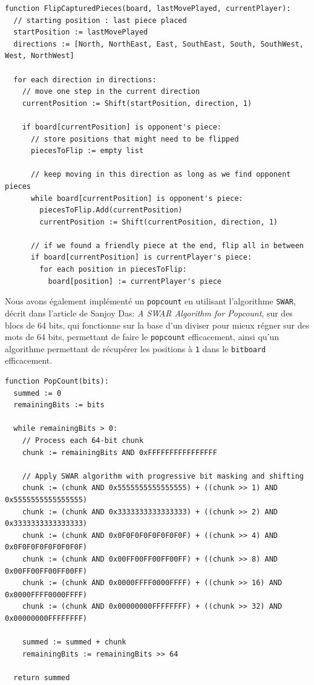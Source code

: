 \documentclass[a4paper,12pt]{article}
\begin{document}
\begin{lstlisting}[caption={Pseudocode pour l'algorithme de capture de pions : FlipCapturedPieces}, label={lst:flip_captured_pieces}]
function FlipCapturedPieces(board, lastMovePlayed, currentPlayer):
  // starting position : last piece placed
  startPosition := lastMovePlayed
  directions := [North, NorthEast, East, SouthEast, South, SouthWest, West, NorthWest]

  for each direction in directions:
    // move one step in the current direction
    currentPosition := Shift(startPosition, direction, 1)

    if board[currentPosition] is opponent's piece:
      // store positions that might need to be flipped
      piecesToFlip := empty list

      // keep moving in this direction as long as we find opponent pieces
      while board[currentPosition] is opponent's piece:
        piecesToFlip.Add(currentPosition)
        currentPosition := Shift(currentPosition, direction, 1)

      // if we found a friendly piece at the end, flip all in between
      if board[currentPosition] is currentPlayer's piece:
        for each position in piecesToFlip:
          board[position] := currentPlayer's piece
\end{lstlisting}

\newpage

Nous avons également implémenté un \texttt{popcount} en utilisant l’algorithme
\texttt{SWAR}, décrit dans l'article de Sanjoy Das: \textit{A SWAR Algorithm
    for Popcount}\cite{SWARPointers}, sur des blocs de 64 bits, qui fonctionne sur
la base d’un diviser pour mieux régner sur des mots de 64 bits, permettant de
faire le \texttt{popcount} efficacement, ainsi qu’un algorithme permettant de
récupérer les positions à \texttt{1} dans le \texttt{bitboard} efficacement.\\

\begin{lstlisting}[caption={Pseudocode pour le popcount (implémentation de l'algorithme SWAR): PopCount}, label={lst:popcount}]
function PopCount(bits):
  summed := 0
  remainingBits := bits

  while remainingBits > 0:
    // Process each 64-bit chunk
    chunk := remainingBits AND 0xFFFFFFFFFFFFFFFF

    // Apply SWAR algorithm with progressive bit masking and shifting
    chunk := (chunk AND 0x5555555555555555) + ((chunk >> 1) AND 0x5555555555555555)
    chunk := (chunk AND 0x3333333333333333) + ((chunk >> 2) AND 0x3333333333333333)
    chunk := (chunk AND 0x0F0F0F0F0F0F0F0F) + ((chunk >> 4) AND 0x0F0F0F0F0F0F0F0F)
    chunk := (chunk AND 0x00FF00FF00FF00FF) + ((chunk >> 8) AND 0x00FF00FF00FF00FF)
    chunk := (chunk AND 0x0000FFFF0000FFFF) + ((chunk >> 16) AND 0x0000FFFF0000FFFF)
    chunk := (chunk AND 0x00000000FFFFFFFF) + ((chunk >> 32) AND 0x00000000FFFFFFFF)

    summed := summed + chunk
    remainingBits := remainingBits >> 64

  return summed
\end{lstlisting}
\end{document}
